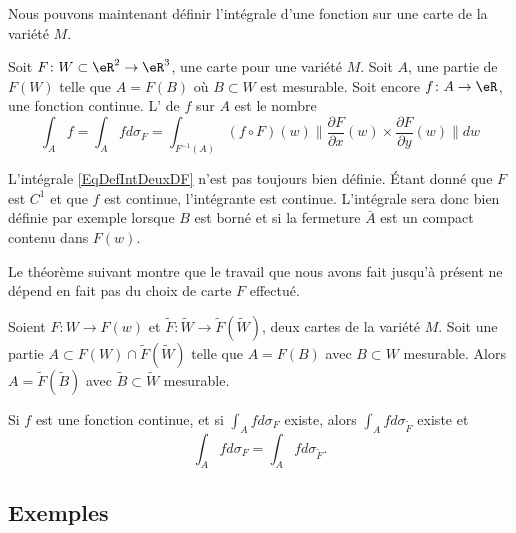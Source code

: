 Nous pouvons maintenant définir l'intégrale d'une fonction sur une carte de la variété $M$.
\begin{definition}
	Soit $F\colon W\subset \eR^2\to \eR^3$, une carte pour une variété $M$. Soit $A$, une partie de $F(W)$ telle que $A=F(B)$ où $B\subset W$ est mesurable.  Soit encore $f\colon A\to \eR$, une fonction continue. L' de $f$ sur $A$ est le nombre
	\begin{equation}	\label{EqDefIntDeuxDF}
		\int_Af=\int_Afd\sigma_F=\int_{F^{-1}(A)}(f\circ F)(w)\|  \frac{ \partial F }{ \partial x }(w)\times\frac{ \partial F }{ \partial y }(w) \| dw
	\end{equation}
\end{definition}

\begin{remark}
	L'intégrale \eqref{EqDefIntDeuxDF} n'est pas toujours bien définie. Étant donné que $F$ est $C^1$ et que $f$ est continue, l'intégrante est continue. L'intégrale sera donc bien définie par exemple lorsque $B$ est borné et si la fermeture $\bar A$ est un compact contenu dans $F(w)$.
\end{remark}

Le théorème suivant montre que le travail que nous avons fait jusqu'à présent ne dépend en fait pas du choix de carte $F$ effectué.

\begin{theorem}\label{ThoIntIndepF}
	Soient $F\colon W\to F(w)$ et $\tilde F\colon \tilde W\to \tilde F(\tilde W)$, deux cartes de la variété $M$. Soit une partie $A\subset F(W)\cap\tilde F(\tilde W)$ telle que $A=F(B)$ avec $B\subset W$ mesurable.  Alors $A=\tilde F(\tilde B)$ avec $\tilde B\subset\tilde W$ mesurable.

	Si $f$ est une fonction continue, et si $\int_Afd\sigma_F$ existe, alors $\int_Afd\sigma_{\tilde F}$ existe et
	\begin{equation}
		\int_Afd\sigma_F=\int_Afd\sigma_{\tilde F}.
	\end{equation}
\end{theorem}


\subsection{Exemples}

